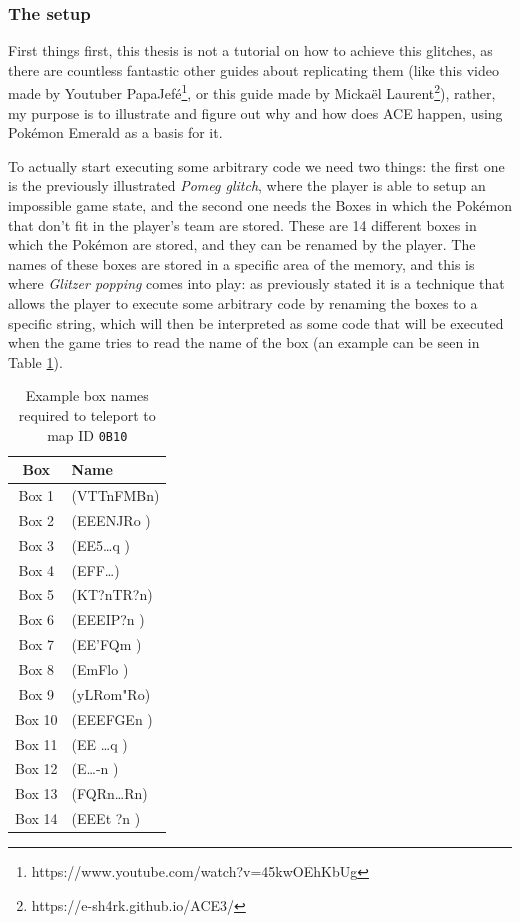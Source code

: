 \documentclass[a4paper]{usiinfbachelorproject}
\begin{document}
\subsubsection{\textbf{The setup}}
\label{sec:setup}
First things first, this thesis is not a tutorial on how to achieve this glitches, as there are countless fantastic other guides about replicating them (like this video made by Youtuber PapaJefé\footnote{https://www.youtube.com/watch?v=45kwOEhKbUg}, or this guide made by Mickaël Laurent\footnote{https://e-sh4rk.github.io/ACE3/}), rather, my purpose is to illustrate and figure out why and how does ACE happen, using Pokémon Emerald as a basis for it.

To actually start executing some arbitrary code we need two things: the first one is the previously illustrated \textit{Pomeg glitch}, where the player is able to setup an impossible game state, and the second one needs the Boxes in which the Pokémon that don't fit in the player's team are stored. These are 14 different boxes in which the Pokémon are stored, and they can be renamed by the player. The names of these boxes are stored in a specific area of the memory, and this is where \textit{Glitzer popping} comes into play: as previously stated it is a technique that allows the player to execute some arbitrary code by renaming the boxes to a specific string, which will then be interpreted as some code that will be executed when the game tries to read the name of the box (an example can be seen in Table \ref{tab:boxes_names}).

\begin{table}[h!]
	\centering
	\begin{tabular}{|c|l|}
		\hline
		\textbf{Box} & \textbf{Name}  \\
		\hline
		Box 1        & (VTTnFMBn)     \\
		Box 2        & (EEENJRo )     \\
		Box 3        & (EE5\dots q  ) \\
		Box 4        & (EFF\dots    ) \\
		Box 5        & (KT?nTR?n)     \\
		Box 6        & (EEEIP?n )     \\
		Box 7        & (EE'FQm  )     \\
		Box 8        & (EmFlo   )     \\
		Box 9        & (yLRom"Ro)     \\
		Box 10       & (EEEFGEn )     \\
		Box 11       & (EE \dots q  ) \\
		Box 12       & (E\dots -n   ) \\
		Box 13       & (FQRn\dots Rn) \\
		Box 14       & (EEEt ?n )     \\
		\hline
	\end{tabular}
	\caption{Example box names required to teleport to map ID \texttt{0B10}}
	\label{tab:boxes_names}
\end{table}
\end{document}
